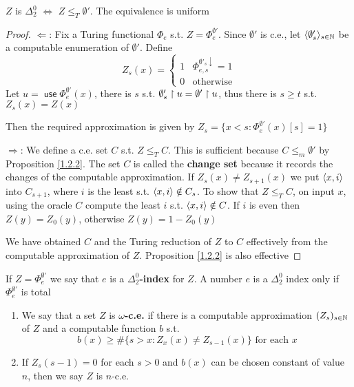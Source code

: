\documentclass[11pt]{article}
\DeclareMathOperator{\use}{\textsf{use}}
\begin{document}
\begin{lemma}
\label{1.4.2}
\(Z\) is \(\Delta_2^0\) \(\Leftrightarrow\) \(Z\le_T\emptyset'\). The equivalence is uniform
\end{lemma}

\begin{proof}
\(\Leftarrow\): Fix a Turing functional \(\Phi_e\) s.t. \(Z=\Phi_e^{\emptyset'}\). Since \(\emptyset'\) is c.e.,
let \(\langle \emptyset'_s\rangle_{s\in\mathbb{N}}\) be a computable enumeration of \(\emptyset'\). Define
\begin{equation*}
Z_s(x)=
\begin{cases}
1&\Phi_{e,s}^{\emptyset'_s\downarrow}=1\\
0&\text{otherwise}
\end{cases}
\end{equation*}
Let \(u=\use\Phi_e^{\emptyset'}(x)\), there is \(s\) s.t. \(\emptyset'_s\upharpoonright u=\emptyset'\upharpoonright u\), thus there is \(s\ge t\)
s.t. \(Z_s(x)=Z(x)\)

Then the required approximation is
given by \(Z_s=\{x<s:\Phi_e^{\emptyset'}(x)[s]=1\}\)

\(\Rightarrow\): We define a c.e. set \(C\) s.t. \(Z\le_TC\). This is sufficient because \(C\le_m\emptyset'\) by
Proposition \ref{1.2.2}. The set \(C\) is called the \textbf{change set} because it records the changes of
the computable approximation. If \(Z_s(x)\neq Z_{s+1}(x)\) we put \(\langle x,i\rangle\) into \(C_{s+1}\),
where \(i\) is the least s.t. \(\langle x,i\rangle\notin C_s\). To show that \(Z\le_TC\), on input \(x\), using the
oracle \(C\) compute the least \(i\) s.t. \(\langle x,i\rangle\notin C\). If \(i\) is even then \(Z(y)=Z_0(y)\),
otherwise \(Z(y)=1-Z_0(y)\)

We have obtained \(C\) and the Turing reduction of \(Z\) to \(C\) effectively from the
computable approximation of \(Z\). Proposition \ref{1.2.2} is also effective
\end{proof}

If \(Z=\Phi_e^{\emptyset'}\) we say that \(e\) is a \textbf{\(\Delta_2^0\)-index} for \(Z\). A number \(e\) is
a \(\Delta_2^0\) index only if \(\Phi_e^{\emptyset'}\) is total

\begin{definition}[]
\begin{enumerate}
\item We say that a set \(Z\) is \textbf{\(\omega\)-c.e.} if there is a computable
approximation \((Z_s)_{s\in\mathbb{N}}\) of \(Z\) and a computable function \(b\) s.t.
\begin{equation*}
b(x)\ge\#\{s>x:Z_x(x)\neq Z_{s-1}(x)\}\text{ for each }x
\end{equation*}
\item If \(Z_s(s-1)=0\) for each \(s>0\) and \(b(x)\) can be chosen constant of value \(n\), then
we say \(Z\) is \(n\)-c.e.
\end{enumerate}
\end{definition}
\end{document}
